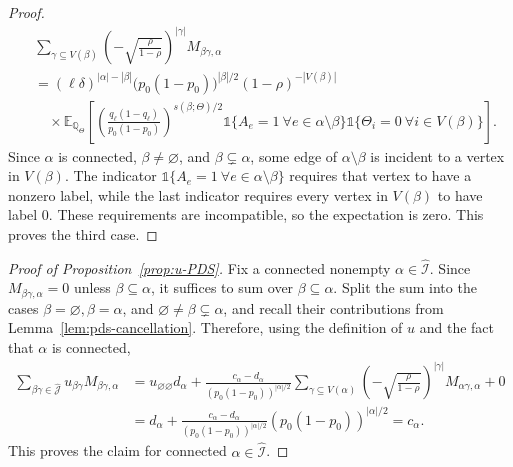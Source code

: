 \documentclass[11pt, letterpaper]{article}
\numberwithin{equation}{section}
\newcommand{\E}{\mathbb{E}}
\newcommand{\QQ}{\mathbb{Q}}
\newcommand{\goodI}{\widehat{\mathcal{I}}}
\newcommand{\goodJ}{\widehat{\mathcal{J}}}
\begin{document}
\begin{proof}
\begin{align*}
    &\sum_{\gamma \subseteq V(\beta)}\left(-\sqrt{\frac{\rho}{1-\rho}}\right)^{|\gamma|}M_{\beta\gamma,\alpha}\\
    &=(\ell\delta)^{|\alpha|-|\beta|}
\bigl(p_0(1-p_0)\bigr)^{|\beta|/2}
(1-\rho)^{-|V(\beta)|} \\
&\quad\times\E_{\QQ_\Theta} \left[
\left(\frac{q_\ell(1-q_\ell)}{p_0(1-p_0)}\right)^{s(\beta;\Theta)/2}
\mathds 1\{A_e=1\ \forall e\in\alpha\setminus\beta\}
\mathds 1\{\Theta_i=0\ \forall i\in V(\beta)\}\right].
\end{align*}
Since $\alpha$ is connected, $\beta\neq\varnothing$, and  $\beta\subsetneq\alpha$, some edge of $\alpha\setminus\beta$ is incident to a vertex in \(V(\beta)\). The indicator $\mathds 1\{A_e=1\ \forall e\in\alpha\setminus\beta\}$ requires that vertex
to have a nonzero label, while the last indicator requires every vertex in $V(\beta)$ to have label $0$. These requirements are incompatible, so the expectation is zero. This proves the third case.
\end{proof}
\begin{proof}[Proof of Proposition~\ref{prop:u-PDS}]
Fix a connected nonempty $\alpha\in\goodI$. Since
$M_{\beta\gamma,\alpha}=0$ unless $\beta\subseteq\alpha$, it suffices to sum over $\beta\subseteq\alpha$. Split the sum into the cases $\beta=\varnothing, \beta=\alpha$, and $\varnothing\neq\beta\subsetneq\alpha$, and recall their contributions from Lemma~\ref{lem:pds-cancellation}. Therefore, using the definition of $u$ and the fact that $\alpha$ is connected,
\begin{align*}
\sum_{\beta\gamma\in\goodJ}
u_{\beta\gamma}M_{\beta\gamma,\alpha}
&=
u_{\varnothing\varnothing}d_\alpha
+
\frac{c_\alpha-d_\alpha}{(p_0(1-p_0))^{|\alpha|/2}}\sum_{\gamma\subseteq V(\alpha)}
\left(-\sqrt{\frac{\rho}{1-\rho}}\right)^{|\gamma|}
M_{\alpha\gamma,\alpha}
+
0 \\
&=
d_\alpha
+
\frac{c_\alpha-d_\alpha}{(p_0(1-p_0))^{|\alpha|/2}}
(p_0(1-p_0))^{|\alpha|/2}=
c_\alpha.
\end{align*}
This proves the claim for connected $\alpha\in\goodI$.   
\end{proof}
\end{document}
